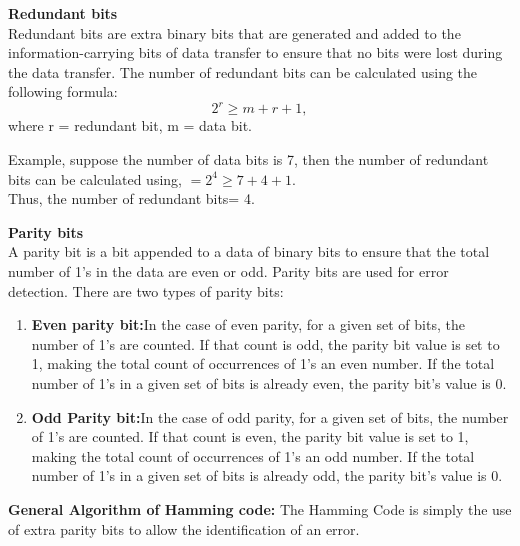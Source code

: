 \documentclass[12pt]{report}
\begin{document}
\begin{defn1}\textbf{Redundant bits}\\
Redundant bits are extra binary bits that are generated and added to the information-carrying bits of data transfer to ensure that no bits were lost during the data transfer. The number of redundant bits can be calculated using the following formula: 
\begin{equation} 2^r \ge m + r + 1, \end{equation} where r = redundant bit, m = data bit.
\end{defn1}
Example, suppose the number of data bits is 7, then the number of redundant bits can be calculated using, $= 2^4 \ge 7 + 4 + 1$.\\
Thus, the number of redundant bits= 4.
\begin{defn1}\textbf{Parity bits}\\ A parity bit is a bit appended to a data of binary bits to ensure that the total number of 1’s in the data are even or odd. Parity bits are used for error detection. There are two types of parity bits:\begin{enumerate}
\item\textbf{Even parity bit:}In the case of even parity, for a given set of bits, the number of 1’s are counted. If that count is odd, the parity bit value is set to 1, making the total count of occurrences of 1’s an even number. If the total number of 1’s in a given set of bits is already even, the parity bit’s value is 0.
\item\textbf{Odd Parity bit:}In the case of odd parity, for a given set of bits, the number of 1’s are counted. If that count is even, the parity bit value is set to 1, making the total count of occurrences of 1’s an odd number. If the total number of 1’s in a given set of bits is already odd, the parity bit’s value is 0.\end{enumerate}\end{defn1}
\textbf{General Algorithm of Hamming code:}
The Hamming Code is simply the use of extra parity bits to allow the identification of an error.
\end{document}
